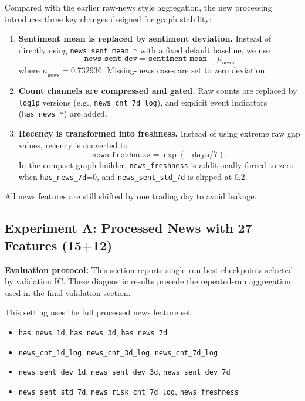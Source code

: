 Compared with the earlier raw-news style aggregation, the new processing introduces three key changes designed for graph stability:

\begin{enumerate}
\item \textbf{Sentiment mean is replaced by sentiment deviation.}
Instead of directly using \texttt{news\_sent\_mean\_*} with a fixed default baseline, we use
\[
\texttt{news\_sent\_dev} = \texttt{sentiment\_mean} - \mu_{\text{news}}
\]
where $\mu_{\text{news}} = 0.732936$. Missing-news cases are set to zero deviation.

\item \textbf{Count channels are compressed and gated.}
Raw counts are replaced by \texttt{log1p} versions (e.g., \texttt{news\_cnt\_7d\_log}), and explicit event indicators (\texttt{has\_news\_*}) are added.

\item \textbf{Recency is transformed into freshness.}
Instead of using extreme raw gap values, recency is converted to
\[
\texttt{news\_freshness} = \exp(-\texttt{days}/7).
\]
In the compact graph builder, \texttt{news\_freshness} is additionally forced to zero when \texttt{has\_news\_7d}=0, and \texttt{news\_sent\_std\_7d} is clipped at 0.2.
\end{enumerate}

All news features are still shifted by one trading day to avoid leakage.

\subsection{Experiment A: Processed News with 27 Features (15+12)}

\textbf{Evaluation protocol:} This section reports single-run best checkpoints selected by validation IC. These diagnostic results precede the repeated-run aggregation used in the final validation section.

This setting uses the full processed news feature set:
\begin{itemize}
\item \texttt{has\_news\_1d}, \texttt{has\_news\_3d}, \texttt{has\_news\_7d}
\item \texttt{news\_cnt\_1d\_log}, \texttt{news\_cnt\_3d\_log}, \texttt{news\_cnt\_7d\_log}
\item \texttt{news\_sent\_dev\_1d}, \texttt{news\_sent\_dev\_3d}, \texttt{news\_sent\_dev\_7d}
\item \texttt{news\_sent\_std\_7d}, \texttt{news\_risk\_cnt\_7d\_log}, \texttt{news\_freshness}
\end{itemize}

